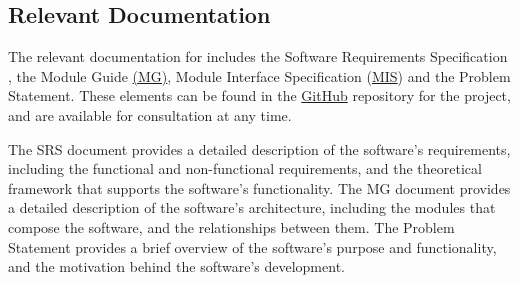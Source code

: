 \documentclass[12pt, titlepage]{article}
\begin{document}


\subsection{Relevant Documentation}

The relevant documentation for \progname{} includes the Software Requirements Specification \citep{SRS},
the Module Guide \href{https://github.com/UGarCil/UGarcil_capstone/blob/main/docs/Design/SoftArchitecture/MG.pdf}{(MG)}, Module Interface Specification (\href{https://github.com/UGarCil/UGarcil_capstone/blob/main/docs/Design/SoftDetailedDes/MIS.pdf}{MIS}) and the Problem Statement. These elements can be found in the \href{https://github.com/UGarCil/UGarcil_capstone}{GitHub}  
repository for the project, and are available for consultation at any time.

The SRS document provides a detailed description of the software's requirements, including the
functional and non-functional requirements, and the theoretical framework that supports the software's
functionality. The MG document provides a detailed description of the software's architecture, including
the modules that compose the software, and the relationships between them. The Problem Statement provides
a brief overview of the software's purpose and functionality, and the motivation behind the software's
development.
\end{document}
